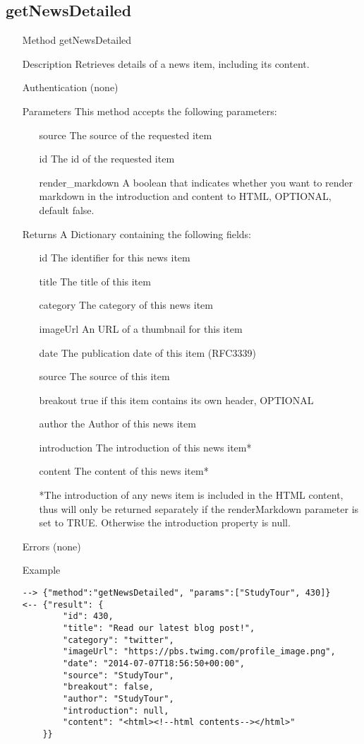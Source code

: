 \documentclass[a4paper]{scrreprt}
\begin{document}
\subsection{getNewsDetailed}
\begin{enumerate}
\item[Method] getNewsDetailed
\item[Description] Retrieves details of a news item, including its content.
\item[Authentication] (none)
\item[Parameters] This method accepts the following parameters:
\begin{enumerate}
	\item[source] The source of the requested item
	\item[id] The id of the requested item
    \item[render\_markdown] A boolean that indicates whether you want to render markdown in the introduction and content to HTML, OPTIONAL, default false.
    \end{enumerate}
\item[Returns] A Dictionary containing the following fields:
\begin{enumerate}
    \item[id] The identifier for this news item
    \item[title] The title of this item
	\item[category] The category of this news item
    \item[imageUrl] An URL of a thumbnail for this item
    \item[date] The publication date of this item (RFC3339)
    \item[source] The source of this item
    \item[breakout] true if this item contains its own header, OPTIONAL
    \item[author] the Author of this news item
    \item[introduction] The introduction of this news item*
    \item[content] The content of this news item*
    \item[] *The introduction of any news item is included in the HTML content, thus will only be returned separately if the renderMarkdown parameter is set to TRUE. Otherwise the introduction property is null.
	\end{enumerate}
\item[Errors] (none)
\item[Example]
\begin{lstlisting}
--> {"method":"getNewsDetailed", "params":["StudyTour", 430]}
<-- {"result": {
        "id": 430,
        "title": "Read our latest blog post!",
        "category": "twitter",
        "imageUrl": "https://pbs.twimg.com/profile_image.png",
        "date": "2014-07-07T18:56:50+00:00",
        "source": "StudyTour",
        "breakout": false,
        "author": "StudyTour",
        "introduction": null,
        "content": "<html><!--html contents--></html>"
    }}
\end{lstlisting}
\end{enumerate}
\end{document}
